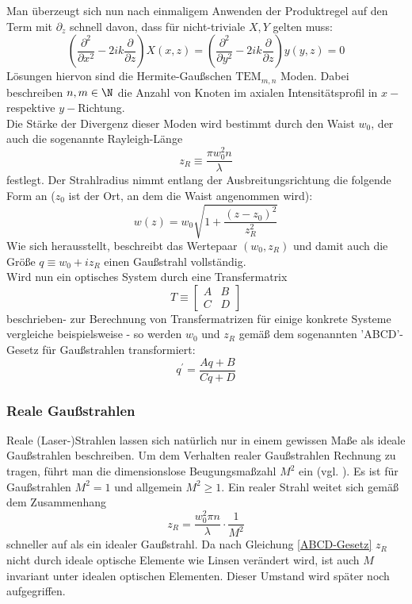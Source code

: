 \documentclass[11pt,a4paper,oneside]{scrartcl}
\begin{document}
Man überzeugt sich nun nach einmaligem Anwenden der Produktregel auf den Term mit $\partial_z$ schnell davon, dass für nicht-triviale $X,Y$ gelten muss:
\begin{equation}
\left(\frac{\partial^2}{\partial x^2}-2ik\frac{\partial}{\partial z}\right)X(x,z)=\left(\frac{\partial^2}{\partial y^2}-2ik\frac{\partial}{\partial z}\right)y(y,z)=0
\end{equation}
Lösungen hiervon sind die Hermite-Gaußschen $\mathrm{TEM}_{m,n}$ Moden. Dabei beschreiben $n,m\in\N$ die Anzahl von Knoten im axialen Intensitätsprofil in $x-$ respektive $y-$Richtung.\\
Die Stärke der Divergenz dieser Moden wird bestimmt durch den Waist $w_0$, der auch die sogenannte Rayleigh-Länge \begin{equation}\label{rayleigh} z_R\equiv \frac{\pi w_0^2n}{\lambda}\end{equation}festlegt. Der Strahlradius nimmt entlang der Ausbreitungsrichtung die folgende Form an ($z_0$ ist der Ort, an dem die Waist angenommen wird):
\begin{equation}
\label{transv_profil}
w(z)=w_0\sqrt{1+\frac{(z-z_0)^2}{z_R^2}}
\end{equation}
Wie sich herausstellt, beschreibt das Wertepaar $(w_0,z_R)$ und damit auch die Größe $q\equiv w_0+iz_R$ einen Gaußstrahl vollständig.\\
Wird nun ein optisches System durch eine Transfermatrix \begin{equation}
T\equiv\begin{bmatrix}
A& B\\
C & D
\end{bmatrix}
\end{equation}
beschrieben- zur Berechnung von Transfermatrizen für einige konkrete Systeme vergleiche beispielsweise \cite{demtröder_2}- so werden $w_0$ und $z_R$ gemäß dem sogenannten 'ABCD'-Gesetz für Gaußstrahlen transformiert:
\begin{equation}\label{ABCD-Gesetz}
q^\prime = \frac{Aq+B}{Cq+D}
\end{equation}
\subsubsection{Reale Gaußstrahlen}\label{Reale Gaußstrahlen}
Reale (Laser-)Strahlen lassen sich natürlich nur in einem gewissen Maße als ideale Gaußstrahlen beschreiben. Um dem Verhalten realer Gaußstrahlen Rechnung zu tragen, führt man die dimensionslose Beugungsmaßzahl $M^2$ ein (vgl. \cite{paschotta2016m2}). Es ist für Gaußstrahlen $M^2=1$ und allgemein $M^2\geq 1$. Ein realer Strahl weitet sich gemäß dem Zusammenhang
\begin{equation}\label{rayleigh_m2}
z_R=\frac{w_0^2\pi n}{\lambda}\cdot \frac1{M^2}
\end{equation}
schneller auf als ein idealer Gaußstrahl. Da nach Gleichung \ref{ABCD-Gesetz} $z_R$ nicht durch ideale optische Elemente wie Linsen verändert wird, ist auch $M$ invariant unter idealen optischen Elementen. Dieser Umstand wird später noch aufgegriffen.
\end{document}
